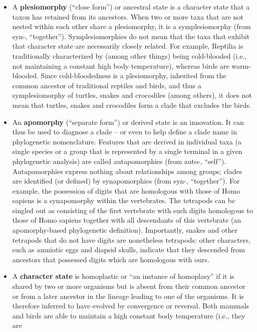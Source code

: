 \documentclass[]{book}
\theoremstyle{definition}
\theoremstyle{definition}
\theoremstyle{definition}
\theoremstyle{remark}
\begin{document}
\begin{enumerate}
\begin{itemize}
\item
  A \textbf{plesiomorphy} (``close form'') or ancestral state is a
  character state that a taxon has retained from its ancestors. When two
  or more taxa that are not nested within each other share a
  plesiomorphy, it is a symplesiomorphy (from syn-, ``together'').
  Symplesiomorphies do not mean that the taxa that exhibit that
  character state are necessarily closely related. For example, Reptilia
  is traditionally characterized by (among other things) being
  cold-blooded (i.e., not maintaining a constant high body temperature),
  whereas birds are warm-blooded. Since cold-bloodedness is a
  plesiomorphy, inherited from the common ancestor of traditional
  reptiles and birds, and thus a symplesiomorphy of turtles, snakes and
  crocodiles (among others), it does not mean that turtles, snakes and
  crocodiles form a clade that excludes the birds.
\item
  An \textbf{apomorphy} (``separate form'') or derived state is an
  innovation. It can thus be used to diagnose a clade -- or even to help
  define a clade name in phylogenetic nomenclature. Features that are
  derived in individual taxa (a single species or a group that is
  represented by a single terminal in a given phylogenetic analysis) are
  called autapomorphies (from auto-, ``self''). Autapomorphies express
  nothing about relationships among groups; clades are identified (or
  defined) by synapomorphies (from syn-, ``together''). For example, the
  possession of digits that are homologous with those of Homo sapiens is
  a synapomorphy within the vertebrates. The tetrapods can be singled
  out as consisting of the first vertebrate with such digits homologous
  to those of Homo sapiens together with all descendants of this
  vertebrate (an apomorphy-based phylogenetic definition). Importantly,
  snakes and other tetrapods that do not have digits are nonetheless
  tetrapods: other characters, such as amniotic eggs and diapsid skulls,
  indicate that they descended from ancestors that possessed digits
  which are homologous with ours.
\item
  A \textbf{character state} is homoplastic or ``an instance of
  homoplasy'' if it is shared by two or more organisms but is absent
  from their common ancestor or from a later ancestor in the lineage
  leading to one of the organisms. It is therefore inferred to have
  evolved by convergence or reversal. Both mammals and birds are able to
  maintain a high constant body temperature (i.e., they are

\end{itemize}
\end{enumerate}
\end{document}
